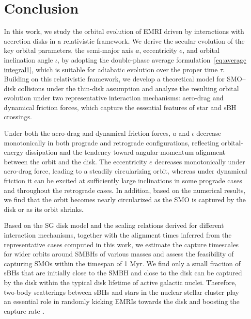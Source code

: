 \documentclass[aps,prx,reprint,superscriptaddress,nofootinbib,longbibliography]{revtex4-1}
\begin{document}
\section{Conclusion}\label{sec:conclusion}
In this work, we study the orbital evolution of EMRI driven by interactions with accretion disks in a relativistic framework. We derive the secular evolution of the key orbital parameters, the semi-major axis $a$, eccentricity $e$, and orbital inclination angle $\iota$, by adopting the double-phase average formulation~\eqref{eq:average integral1}, which is suitable for adiabatic evolution over the proper time $\tau$.
Building on this relativistic framework, we develop a theoretical model for SMO–disk collisions under the thin-disk assumption and analyze the resulting orbital evolution under two representative interaction mechanisms: aero-drag and dynamical friction forces, which capture the essential features of star and sBH crossings.\par
Under both the aero-drag and dynamical friction forces, $a$ and $\iota$ decrease monotonically in both prograde and retrograde configurations, reflecting orbital-energy dissipation and the tendency toward angular-momentum alignment between the orbit and the disk. The eccentricity $e$ decreases monotonically under aero-drag force, leading to a steadily circularizing orbit, whereas under dynamical friction it can be excited at sufficiently large inclinations in some prograde cases and throughout the retrograde cases. In addition, based on the numerical results, we find that the orbit  becomes nearly circularized as the SMO is captured by the disk or as its orbit shrinks.\par
Based on the SG disk model and the scaling relations derived for different interaction mechanisms, together with the alignment times inferred from the representative cases computed in this work, we estimate the capture timescales for wider orbits around SMBHs of various masses and assess the feasibility of capturing SMOs within the timespan of 1 Myr.
We find only a small fraction of sBHs that are initially close to the SMBH and close to the disk
can be captured by the disk within the typical disk lifetime of active galactic nuclei. Therefore, two-body scatterings between sBHs and stars in the nuclear stellar cluster  play an essential role in randomly kicking EMRIs towards the disk and boosting the capture rate \cite{PhysRevD.105.083005}.
\end{document}
